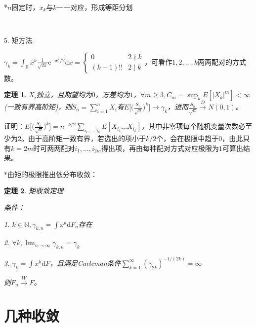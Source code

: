 \documentclass[a4paper,UTF8,fontset=windows]{ctexart}
\newtheorem{thm}{定理}[section]
\newcommand{\con}[1]{\stackrel{#1}{\longrightarrow}}
\begin{document}
*$n$固定时，$x_k$与$k$一一对应，形成等距分划

~

5. 矩方法

$\gamma_k=\int_\mathbb{R}x^k\frac{1}{\sqrt{2\pi}}\mathrm{e}^{-x^2/2}\mathrm{d}x=\begin{cases}0&2\nmid k\\(k-1)!!&2\mid k\end{cases}$，可看作$1,2,\dots,k$两两配对的方式数。

\begin{thm}
$X_i$独立，且期望均为$0$，方差均为$1$，$\forall m\ge3,C_m=\sup_kE[|X_k|^m]<\infty$(\emph{一致有界高阶矩})，则$S_n=\sum_{i=1}^nX_i$有$E\bigg[\bigg(\frac{S_n}{\sqrt{n}}\bigg)^k\bigg]\con{}\gamma_k$，进而$\frac{S_n}{\sqrt{n}}\con{D}N(0,1)$。
\end{thm}

证明：$E\bigg[\bigg(\frac{S_n}{\sqrt{n}}\bigg)^k\bigg]=n^{-k/2}\sum_{i_1,\dots,i_k}E[X_{i_1}\dots X_{i_k}]$，其中非零项每个随机变量次数必至少为2。由于高阶矩一致有界，若选出的项小于$k/2$个，会在极限中趋于0，由此只有$k=2m$时可两两配对$i_1,\dots,i_{2m}$得出项，再由每种配对方式对应极限为$1$可算出结果。

*由矩的极限推出依分布收敛：

\begin{thm} \emph{矩收敛定理}

条件：

1. $k\in\mathbb{N},\gamma_{k,n}=\int x^k\mathrm{d}F_n$存在

2. $\forall k,\lim_{n\to\infty}\gamma_{k,n}=\gamma_k$

3. $\gamma_k=\int x^k\mathrm{d}F$，且满足\emph{Carleman条件}$\sum_{k=1}^\infty(\gamma_{2k})^{-1/(2k)}=\infty$

则$F_n\con{W}F$。
\end{thm}

\section{几种收敛}
\end{document}
